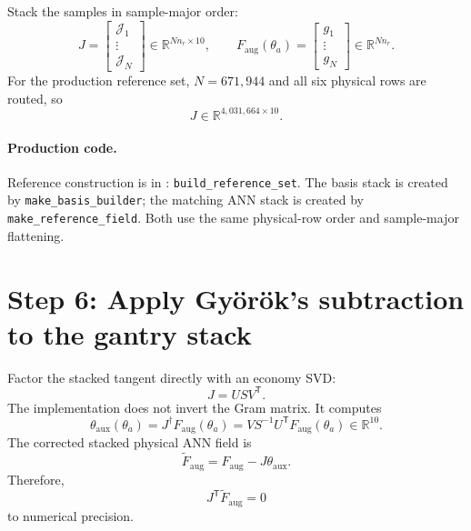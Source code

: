 \documentclass[11pt,a4paper]{article}
\newcommand{\R}{\mathbb{R}}
\newcommand{\T}{\mathsf{T}}
\newcommand{\code}[1]{\texttt{#1}}
\begin{document}
Stack the samples in sample-major order:
\begin{equation}
\boxed{
J
=\begin{bmatrix}\mathcal J_1\\ \vdots\\ \mathcal J_N\end{bmatrix}
\in\R^{Nn_r\times10},
\qquad
F_{\mathrm{aug}}(\theta_a)
=\begin{bmatrix}g_1\\ \vdots\\ g_N\end{bmatrix}
\in\R^{Nn_r}.
}
\label{eq:gantry-stacks}
\end{equation}
For the production reference set, \(N=671{,}944\) and all six physical rows
are routed, so
\begin{equation}
J\in\R^{4{,}031{,}664\times10}.
\end{equation}

\paragraph{Production code.}
Reference construction is in
:
\code{build\_reference\_set}.  The basis stack is created by
\code{make\_basis\_builder}; the matching ANN stack is created by
\code{make\_reference\_field}.  Both use the same physical-row order and
sample-major flattening.

\clearpage
\section{Step 6: Apply Gy\"or\"ok's subtraction to the gantry stack}

Factor the stacked tangent directly with an economy SVD:
\begin{equation}
J=USV^\T.
\end{equation}
The implementation does not invert the Gram matrix.  It computes
\begin{equation}
\boxed{
\theta_{\mathrm{aux}}(\theta_a)
=J^\dagger F_{\mathrm{aug}}(\theta_a)
=VS^{-1}U^\T F_{\mathrm{aug}}(\theta_a)
\in\R^{10}.
}
\label{eq:gantry-aux}
\end{equation}
The corrected stacked physical ANN field is
\begin{equation}
\boxed{
\widetilde F_{\mathrm{aug}}
=F_{\mathrm{aug}}-J\theta_{\mathrm{aux}}.
}
\label{eq:gantry-corrected-stack}
\end{equation}
Therefore,
\begin{equation}
\boxed{J^\T\widetilde F_{\mathrm{aug}}=0}
\label{eq:gantry-orthogonality}
\end{equation}
to numerical precision.
\end{document}
